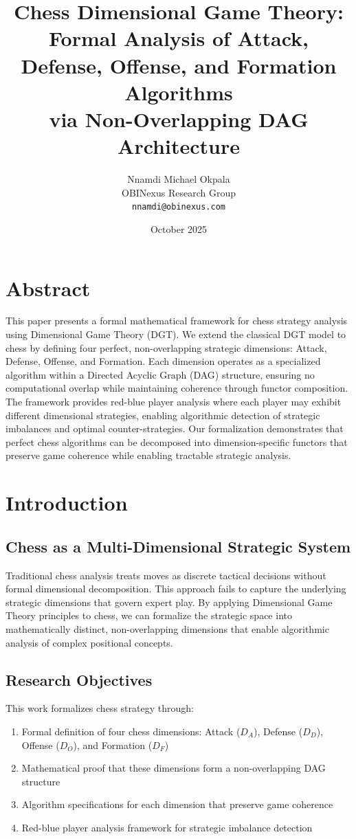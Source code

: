 \documentclass[12pt,a4paper]{article}
\title{
\textbf{Chess Dimensional Game Theory: \\
Formal Analysis of Attack, Defense, Offense, and Formation Algorithms \\
via Non-Overlapping DAG Architecture}
}
\author{
Nnamdi Michael Okpala \\
OBINexus Research Group \\
\texttt{nnamdi@obinexus.com}
}
\date{October 2025}
\begin{document}
\maketitle
\tableofcontents
\newpage

\section*{Abstract}

This paper presents a formal mathematical framework for chess strategy analysis using Dimensional Game Theory (DGT). We extend the classical DGT model to chess by defining four perfect, non-overlapping strategic dimensions: Attack, Defense, Offense, and Formation. Each dimension operates as a specialized algorithm within a Directed Acyclic Graph (DAG) structure, ensuring no computational overlap while maintaining coherence through functor composition. The framework provides red-blue player analysis where each player may exhibit different dimensional strategies, enabling algorithmic detection of strategic imbalances and optimal counter-strategies. Our formalization demonstrates that perfect chess algorithms can be decomposed into dimension-specific functors that preserve game coherence while enabling tractable strategic analysis.

\section{Introduction}

\subsection{Chess as a Multi-Dimensional Strategic System}

Traditional chess analysis treats moves as discrete tactical decisions without formal dimensional decomposition. This approach fails to capture the underlying strategic dimensions that govern expert play. By applying Dimensional Game Theory principles to chess, we can formalize the strategic space into mathematically distinct, non-overlapping dimensions that enable algorithmic analysis of complex positional concepts.

\subsection{Research Objectives}

This work formalizes chess strategy through:
\begin{enumerate}
\item Formal definition of four chess dimensions: Attack ($D_A$), Defense ($D_D$), Offense ($D_O$), and Formation ($D_F$)
\item Mathematical proof that these dimensions form a non-overlapping DAG structure
\item Algorithm specifications for each dimension that preserve game coherence
\item Red-blue player analysis framework for strategic imbalance detection
\end{enumerate}
\end{document}
